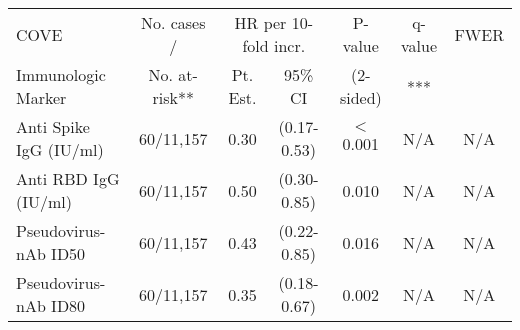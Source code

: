 \begin{tabular}{lcccccc}
   \hline
 
         \multicolumn{1}{l}{COVE} & \multicolumn{1}{c}{No. cases /}   & \multicolumn{2}{c}{HR per 10-fold incr.}                     & \multicolumn{1}{c}{P-value}   & \multicolumn{1}{c}{q-value}   & \multicolumn{1}{c}{FWER} \\ 
         \multicolumn{1}{l}{Immunologic Marker}            & \multicolumn{1}{c}{No. at-risk**} & \multicolumn{1}{c}{Pt. Est.} & \multicolumn{1}{c}{95\% CI} & \multicolumn{1}{c}{(2-sided)} & \multicolumn{1}{c}{***} & \multicolumn{1}{c}{} \\ 
         \hline
 
    Anti Spike IgG (IU/ml) & 60/11,157 & 0.30 & (0.17-0.53) & $<$0.001 & N/A & N/A \\ 
  Anti RBD IgG (IU/ml) & 60/11,157 & 0.50 & (0.30-0.85) & 0.010 & N/A & N/A \\ 
  Pseudovirus-nAb ID50 & 60/11,157 & 0.43 & (0.22-0.85) & 0.016 & N/A & N/A \\ 
  Pseudovirus-nAb ID80 & 60/11,157 & 0.35 & (0.18-0.67) & 0.002 & N/A & N/A \\ 
   \hline
\end{tabular}
